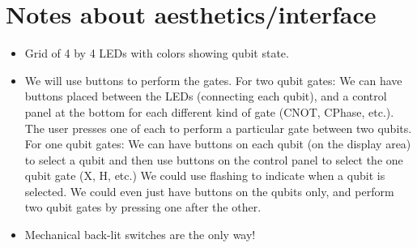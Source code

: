 \documentclass{article}
\begin{document}
\section{Notes about aesthetics/interface}
\begin{itemize}
\item Grid of 4 by 4 LEDs with colors showing qubit state.
\item We will use buttons to perform the gates. For two qubit gates: We can have buttons placed between the LEDs (connecting each qubit), and a control panel at the bottom for each different kind of gate (CNOT, CPhase, etc.). The user presses one of each to perform a particular gate between two qubits. For one qubit gates: We can have buttons on each qubit (on the display area) to select a qubit and then use buttons on the control panel to select the one qubit gate (X, H, etc.) We could use flashing to indicate when a qubit is selected. We could even just have buttons on the qubits only, and perform two qubit gates by pressing one after the other.
\item Mechanical back-lit switches are the only way!
\end{itemize}

\end{document}
